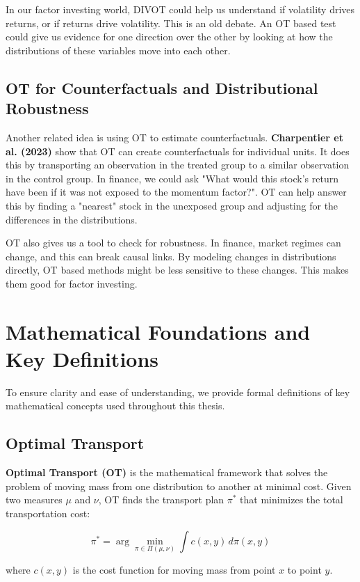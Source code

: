 In our factor investing world, DIVOT could help us understand if volatility drives returns, or if returns drive volatility. This is an old debate. An OT based test could give us evidence for one direction over the other by looking at how the distributions of these variables move into each other.

\subsection*{OT for Counterfactuals and Distributional Robustness}
Another related idea is using OT to estimate counterfactuals. \textbf{Charpentier et al. (2023)} show that OT can create counterfactuals for individual units\cite{Charpentier23}. It does this by transporting an observation in the treated group to a similar observation in the control group. In finance, we could ask "What would this stock's return have been if it was not exposed to the momentum factor?". OT can help answer this by finding a "nearest" stock in the unexposed group and adjusting for the differences in the distributions.

OT also gives us a tool to check for robustness. In finance, market regimes can change, and this can break causal links. By modeling changes in distributions directly, OT based methods might be less sensitive to these changes. This makes them good for factor investing.

\section{Mathematical Foundations and Key Definitions}

To ensure clarity and ease of understanding, we provide formal definitions of key mathematical concepts used throughout this thesis.

\subsection*{Optimal Transport}
\textbf{Optimal Transport (OT)} is the mathematical framework that solves the problem of moving mass from one distribution to another at minimal cost. Given two measures $\mu$ and $\nu$, OT finds the transport plan $\pi^*$ that minimizes the total transportation cost:

\[
\pi^* = \arg\min_{\pi \in \Pi(\mu, \nu)} \int c(x, y) \, d\pi(x, y)
\]

where $c(x, y)$ is the cost function for moving mass from point $x$ to point $y$.

